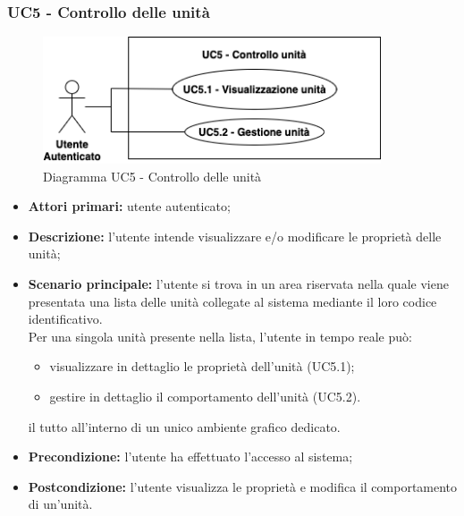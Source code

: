 \subsubsection{UC5 - Controllo delle unità}
\begin{figure}[h!]
    \centering
    \includegraphics[width=10cm]{images/uc5.png}
    \caption{Diagramma UC5 - Controllo delle unità}
\end{figure}
\begin{itemize}
    \item \textbf{Attori primari:} utente autenticato;
    \item \textbf{Descrizione:} l'utente intende visualizzare e/o modificare le proprietà delle unità;
    \item \textbf{Scenario principale:} l'utente si trova in un area riservata nella quale viene presentata una lista delle unità collegate al sistema mediante il loro codice identificativo.\\
    Per una singola unità presente nella lista, l'utente in tempo reale può:
    \begin{itemize}
        \item visualizzare in dettaglio le proprietà dell'unità (UC5.1);
        \item gestire in dettaglio il comportamento dell'unità (UC5.2).
    \end{itemize}
    il tutto all'interno di un unico ambiente grafico dedicato.
    \item \textbf{Precondizione:} l'utente ha effettuato l'accesso al sistema;
    \item \textbf{Postcondizione:} l'utente visualizza le proprietà e modifica il comportamento di un'unità.
\end{itemize}
\newpage
